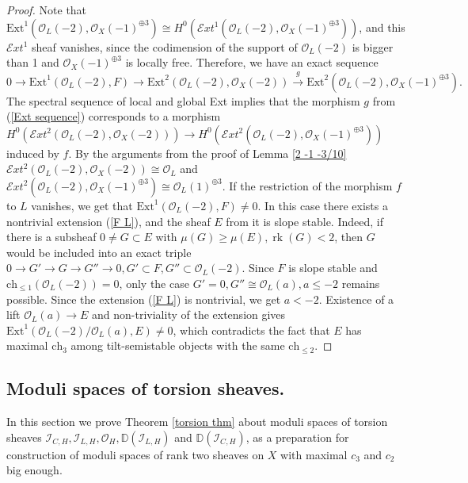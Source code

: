 \documentclass{amsart}
\DeclareMathOperator{\rk}{{rk}}
\begin{document}
\begin{proof}
	Note that $\mathrm{Ext}^1(\mathcal O_L(-2),\mathcal O_X(-1)^{\oplus 3})\cong H^0(\mathcal Ext^1(\mathcal O_L(-2),\mathcal O_X(-1)^{\oplus 3}))$, and this $\mathcal Ext^1$ sheaf vanishes, since the codimension of the support of $\mathcal O_L(-2)$ is bigger than 1 and $\mathcal O_X(-1)^{\oplus 3}$ is locally free. Therefore, we have an exact sequence
	\begin{equation}\label{Ext sequence}0\to\mathrm{Ext}^1(\mathcal O_L(-2),F)\to\mathrm{Ext}^2(\mathcal O_L(-2),\mathcal O_X(-2))\overset{g}{\to}\mathrm{Ext}^2(\mathcal O_L(-2),\mathcal O_X(-1)^{\oplus 3}).\end{equation}
	The spectral sequence of local and global Ext implies that the morphism $g$ from (\ref{Ext sequence}) corresponds to a morphism $H^0(\mathcal Ext^2(\mathcal O_L(-2),\mathcal O_X(-2)))\to H^0(\mathcal Ext^2(\mathcal O_L(-2),\mathcal O_X(-1)^{\oplus 3}))$ induced by $f$. By the arguments from the proof of Lemma \ref{2 -1 -3/10} $\mathcal Ext^2(\mathcal O_L(-2),\mathcal O_X(-2))\cong\mathcal O_L$ and \linebreak$\mathcal Ext^2(\mathcal O_L(-2),\mathcal O_X(-1)^{\oplus 3})\cong\mathcal O_L(1)^{\oplus 3}$. 
	If the restriction of the morphism $f$ to $L$ vanishes, we get that $\mathrm{Ext}^1(\mathcal O_L(-2),F)\neq 0$. In this case there exists a nontrivial extension (\ref{F L}), and the sheaf $E$ from it is slope stable. Indeed, if there is a subsheaf $0\neq G\subset E$ with $\mu(G)\ge\mu(E),\rk(G)<2$, then $G$ would be included into an exact triple $0\to G'\to G\to G''\to 0,G'\subset F,G''\subset\mathcal O_L(-2)$. Since $F$ is slope stable and $\mathrm{ch}_{\le 1}(\mathcal O_L(-2))=0$, only the case $G'=0,G''\cong\mathcal O_L(a),a\le -2$ remains possible. Since the extension (\ref{F L}) is nontrivial, we get $a<-2$. Existence of a lift $\mathcal O_L(a)\to E$ and non-triviality of the extension gives $\mathrm{Ext}^1(\mathcal O_L(-2)/\mathcal O_L(a),E)\neq 0$, which contradicts the fact that $E$ has maximal $\mathrm{ch}_3$ among tilt-semistable objects with the same $\mathrm{ch}_{\le 2}$.
\end{proof}

\subsection{Moduli spaces of torsion sheaves.}\label{torsion}
In this section we prove Theorem \ref{torsion thm} about moduli spaces of torsion sheaves $\mathcal I_{C,H},\mathcal I_{L,H},\mathcal O_H,\mathbb D(\mathcal I_{L,H})$ and $\mathbb D(\mathcal I_{C,H})$, as a preparation for construction of moduli spaces of rank two sheaves on $X$ with maximal $c_3$ and $c_2$ big enough.
\end{document}
